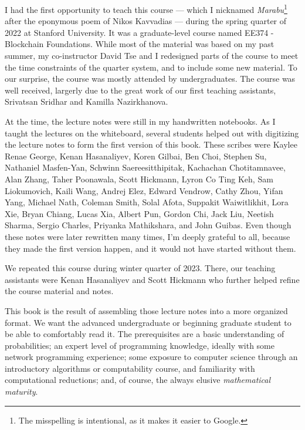 I had the first opportunity to teach this course --- which I nicknamed
\emph{Marabu}\footnote{The misspelling is intentional, as it makes it easier to Google.}
after the eponymous poem of Nikos Kavvadias --- during the
spring quarter of 2022 at Stanford University. It was a graduate-level course
named EE374 - Blockchain Foundations. While most of the material was
based on my past summer, my co-instructor David Tse and I redesigned
parts of the course to meet the time constraints of the quarter system,
and to include some new material. To our surprise, the course was mostly
attended by undergraduates.
The course was well received,
largerly due to the great work of our first teaching assistants,
Srivatsan Sridhar and Kamilla Nazirkhanova.

At the time, the lecture notes were still
in my handwritten notebooks. As I taught the lectures on the whiteboard,
several students helped out with digitizing the lecture notes to
form the first version of this book. These scribes were
Kaylee Renae George, Kenan Hasanaliyev, Koren Gilbai,
Ben Choi, Stephen Su, Nathaniel Masfen-Yan,
Schwinn Saereesitthipitak, Kachachan Chotitamnavee, Alan Zhang,
Taher Poonawala, Scott Hickmann,
Lyron Co Ting Keh, Sam Liokumovich,
Kaili Wang, Andrej Elez,
Edward Vendrow, Cathy Zhou,
Yifan Yang,
Michael Nath, Coleman Smith,
Solal Afota,
Suppakit Waiwitlikhit, Lora Xie,
Bryan Chiang, Lucas Xia,
Albert Pun, Gordon Chi,
Jack Liu,
Neetish Sharma, Sergio Charles,
Priyanka Mathikshara, and John Guibas.
Even though these notes were later rewritten many times,
I'm deeply grateful to all, because they made the first version happen,
and it would not have started without them.

We repeated this course during winter quarter of 2023.
There, our teaching assistants were Kenan Hasanaliyev
and Scott Hickmann who further helped refine the course material and notes.

This book is the result of assembling those lecture notes into a
more organized format. We want the advanced undergraduate or beginning
graduate student to be able to comfortably read it. The prerequisites
are a basic understanding of probabilities; an expert level of programming
knowledge, ideally with some network programming experience; some exposure
to computer science through an introductory algorithms or computability
course, and familiarity with computational reductions;
and, of course, the always elusive \emph{mathematical maturity}.

